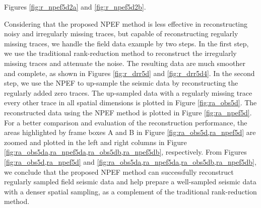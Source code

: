 Figures \ref{fig:r_npef5d2a} and \ref{fig:r_npef5d2b}.

Considering that the proposed NPEF method is less effective in reconstructing noisy and irregularly missing traces, but capable of reconstructing regularly missing traces, we handle the field data example by two steps. In the first step, we use the traditional rank-reduction method to reconstruct the irregularly missing traces and attenuate the noise. The resulting data are much smoother and complete, as shown in Figures \ref{fig:r_drr5d} and \ref{fig:r_drr5d4}. In the second step, we use the NPEF to up-sample the seismic data by reconstructing the regularly added zero traces. The up-sampled data with a regularly missing trace every other trace in all spatial dimensions is plotted in Figure \ref{fig:ra_obs5d}. The reconstructed data using the NPEF method is plotted in Figure \ref{fig:ra_npef5d}. For a better comparison and evaluation of the reconstruction performance, the areas highlighted by frame boxes A and B in Figure \ref{fig:ra_obs5d,ra_npef5d} are zoomed and plotted in the left and right columns in Figure \ref{fig:ra_obs5da,ra_npef5da,ra_obs5db,ra_npef5db}, respectively. From Figures \ref{fig:ra_obs5d,ra_npef5d} and  \ref{fig:ra_obs5da,ra_npef5da,ra_obs5db,ra_npef5db}, we conclude that the proposed NPEF method can successfully reconstruct regularly sampled field seismic data and help prepare a well-sampled seismic data with a denser spatial sampling, as a complement of the traditional rank-reduction method.   


